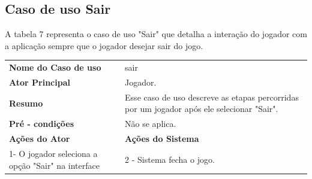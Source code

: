 \subsection{Caso de uso Sair} 
A tabela 7 representa o caso de uso "Sair" que detalha a interação do jogador com a aplicação sempre que o jogador desejar sair do jogo.

\begin{table}  [h!]
\centering 
{} \begin{tabular}{ | m{5cm} | m{8cm}| }  
\hline 
\textbf {Nome do Caso de uso} & sair \\  
\textbf {Ator Principal} & Jogador. \\  
\textbf {Resumo} & Esse caso de uso descreve as etapas percorridas por um jogador após ele selecionar "Sair".\\ 
\textbf {Pré - condições} & Não se aplica.\\ 
\hline 
\textbf {Ações do Ator} & \textbf {Ações do Sistema}\\ 
\hline 
1- O jogador seleciona a opção "Sair" na interface & 2 - Sistema fecha o jogo.\\ 
\hline 
\end{tabular} 
\end{table} 
 